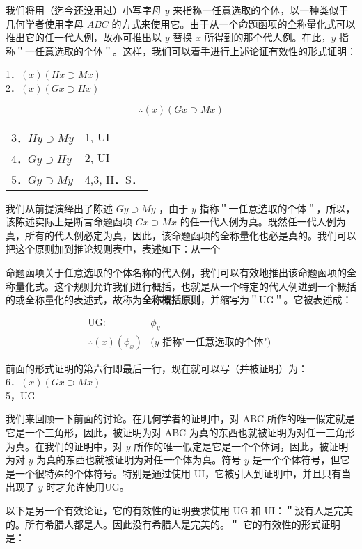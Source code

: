 我们将用（迄今还没用过）小写字母 $y$ 来指称一任意选取的个体，以一种类似于几何学者使用字母 $A B C$ 的方式来使用它。由于从一个命题函项的全称量化式可以推出它的任一代人例，故亦可推出以 $y$ 替换 $x$ 所得到的那个代人例。在此，$y$ 指称＂一任意选取的个体＂。这样，我们可以着手进行上述论证有效性的形式证明：

1．$(x)(H x \supset M x)$\\
2．$(x)(G x \supset H x)$

$$
\therefore(x)(G x \supset M x)
$$

\begin{center}
\begin{tabular}{ll}
3．$H y \supset M y$ & 1, UI \\
4．$G y \supset H y$ & 2, UI \\
5．$G y \supset M y$ & 4,3, H．S． \\
\end{tabular}
\end{center}

我们从前提演绎出了陈述 $G y \supset M y$ ，由于 $y$ 指称＂一任意选取的个体＂，所以，该陈述实际上是断言命题函项 $G x \supset M x$ 的任一代人例为真。既然任一代人例为真，所有的代人例必定为真，因此，该命题函项的全称量化也必是真的。我们可以把这个原则加到推论规则表中，表述如下：从一个

命题函项关于任意选取的个体名称的代入例，我们可以有效地推出该命题函项的全称量化式。这个规则允许我们进行概括，也就是从一个特定的代人例进到一个概括的或全称量化的表述式，故称为\textbf{全称概括原则}，并缩写为＂UG＂。它被表述成：

$$
\begin{aligned}
\mathrm{UG}: & \phi_{y} \\
\therefore(x)\left(\phi_{x}\right) & (y \text { 指称"一任意选取的个体") }
\end{aligned}
$$

前面的形式证明的第六行即最后一行，现在就可以写（并被证明）为：\\
6．$(x)(G x \supset M x)$\\
5，UG

我们来回顾一下前面的讨论。在几何学者的证明中，对 ABC 所作的唯一假定就是它是一个三角形，因此，被证明为对 ABC 为真的东西也就被证明为对任一三角形为真。在我们的证明中，对 $y$ 所作的唯一假定是它是一个个体词，因此，被证明为对 $y$ 为真的东西也就被证明为对任一个体为真。符号 $y$ 是一个个体符号，但它是一个很特殊的个体符号。特别是通过使用 UI，它被引人到证明中，并且只有当出现了 $y$ 时才允许使用UG。

以下是另一个有效论证，它的有效性的证明要求使用 UG 和 UI：＂没有人是完美的。所有希腊人都是人。因此没有希腊人是完美的。＂\cite{kneale1962} 它的有效性的形式证明是：

